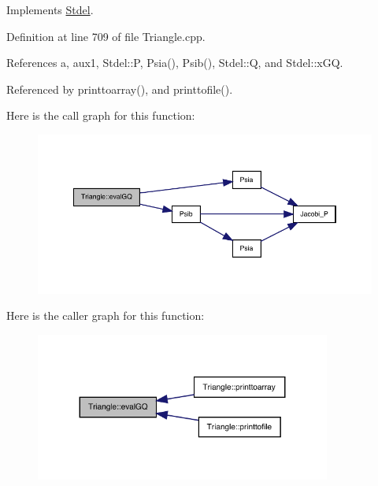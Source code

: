 Implements \hyperlink{classStdel_aac725224c4c3433228ca6841fe7aba49}{Stdel}.



Definition at line 709 of file Triangle.\+cpp.



References a, aux1, Stdel\+::P, Psia(), Psib(), Stdel\+::Q, and Stdel\+::x\+GQ.



Referenced by printtoarray(), and printtofile().

Here is the call graph for this function\+:
\nopagebreak
\begin{figure}[H]
\begin{center}
\leavevmode
\includegraphics[width=350pt]{classTriangle_acb912416d2fe57c6c4a501fdc123e6d3_cgraph}
\end{center}
\end{figure}
Here is the caller graph for this function\+:
\nopagebreak
\begin{figure}[H]
\begin{center}
\leavevmode
\includegraphics[width=275pt]{classTriangle_acb912416d2fe57c6c4a501fdc123e6d3_icgraph}
\end{center}
\end{figure}
\mbox{\label{classTriangle_aac6e3645b886cfd2f4f406157b696d5a}} 
